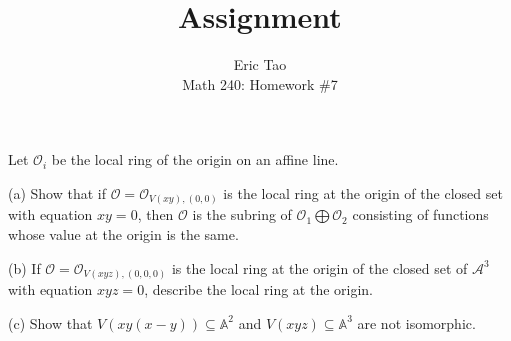\documentclass[10pt]{article}
\newenvironment{problem}[2][Problem]{\begin{trivlist}
\item[\hskip \labelsep {\bfseries #1}\hskip \labelsep {\bfseries #2.}]}{\end{trivlist}}
\begin{document}
 
\title{Assignment}
\author{Eric Tao\\
Math 240: Homework \#7}
\maketitle
 
\begin{problem}{7.1}
Let $\mathcal{O}_i$ be the local ring of the origin on an affine line.

(a) Show that if $\mathcal{O} = \mathcal{O}_{V(xy),(0,0)}$ is the local ring at the origin of the closed set with equation $xy = 0$, then $\mathcal{O}$ is the subring of $\mathcal{O}_1 \bigoplus \mathcal{O}_2$ consisting of functions whose value at the origin is the same.

(b) If $\mathcal{O} = \mathcal{O}_{V(xyz),(0,0,0)}$ is the local ring at the origin of the closed set of $\mathcal{A}^3$ with equation $xyz = 0$, describe the local ring at the origin.

(c) Show that $V(xy(x-y)) \subseteq \mathbb{A}^2$ and $V(xyz) \subseteq \mathbb{A}^3$ are not isomorphic.

\end{problem}
\end{document}
